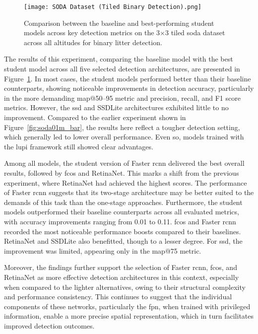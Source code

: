 \begin{figure}[!ht]
    \centering
    \texttt{[image: SODA Dataset (Tiled Binary Detection).png]}
    \caption{Comparison between the baseline and best-performing student models across key detection metrics on the 3$\times$3 tiled \gls{soda} dataset across all altitudes for binary litter detection.}
    \label{fig:soda_tiled_single_bar}
\end{figure}

The results of this experiment, comparing the baseline model with the best student model across all five selected detection architectures, are presented in Figure~\ref{fig:soda_tiled_single_bar}. In most cases, the student models performed better than their baseline counterparts, showing noticeable improvements in detection accuracy, particularly in the more demanding \gls{map}@50–95 metric and precision, recall, and F1 score metrics. However, the \gls{ssd} and SSDLite architectures exhibited little to no improvement.
Compared to the earlier experiment shown in Figure~\ref{fig:soda01m_bar}, the results here reflect a tougher detection setting, which generally led to lower overall performance. Even so, models trained with the \gls{lupi} framework still showed clear advantages. 

Among all models, the student version of Faster \gls{rcnn} delivered the best overall results, followed by \gls{fcos} and RetinaNet. This marks a shift from the previous experiment, where RetinaNet had achieved the highest scores. The performance of Faster \gls{rcnn} suggests that its two-stage architecture may be better suited to the demands of this task than the one-stage approaches. Furthermore, the student models outperformed their baseline counterparts across all evaluated metrics, with accuracy improvements ranging from 0.01 to 0.11. \gls{fcos} and Faster \gls{rcnn} recorded the most noticeable performance boosts compared to their baselines. RetinaNet and SSDLite also benefitted, though to a lesser degree. For \gls{ssd}, the improvement was limited, appearing only in the \gls{map}@75 metric.

Moreover, the findings further support the selection of Faster \gls{rcnn}, \gls{fcos}, and RetinaNet as more effective detection architectures in this context, especially when compared to the lighter alternatives, owing to their structural complexity and performance consistency. This continues to suggest that the individual components of these networks, particularly the \gls{fpn}, when trained with privileged information, enable a more precise spatial representation, which in turn facilitates improved detection outcomes. 


